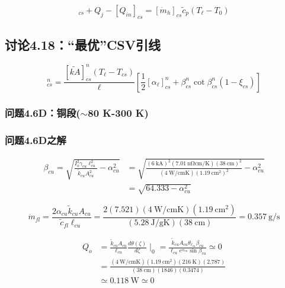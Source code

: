 \begin{equation}%
[Q_\ell]_{cs}+Q_j-[Q_{in}]_{cs}=[\dot{m}_h]_{cs}\tilde{c}_p(T_\ell-T_0)
\end{equation}


\subsection{讨论4.18：“最优”CSV引线}

\begin{equation}%
[Q_\ell]_{cs}^{n}=\frac{[\tilde{kA}]_{cs}^{n}(T_\ell-T_{cs})}{\ell}\left[\frac{1}{2}[\alpha_\ell]_{cs}^{n}+\beta_{cs}^{n}\cot\beta_{cs}^{n}(1-\xi_{cs})\right]
\end{equation}


\subsubsection{问题4.6D：铜段($\sim$80 K-300 K)}



\subsubsection{问题4.6D之解}
\begin{align*}
\beta_{cu}=\sqrt{\frac{I_{o}^{2}\gamma_{cu}\ell_{cu}^{2}}{\tilde{k}_{cu}A_{cu}^{2}}-\alpha_{cu}^{2}}&=\sqrt{\frac{(6\ \mathrm{kA})^2(7.01\ \mathrm{n\Omega cm/K})(38\ \mathrm{cm})^2}{(4\ \mathrm{W /cmK})(1.19\ \mathrm{cm^2})^2}-\alpha_{cu}^{2}} \\
&=\sqrt{64.333-\alpha_{cu}^{2}}
\end{align*}

\begin{equation}
\dot{m}_{fl}=\frac{2\alpha_{cu}\tilde{k}_{cu}A_{cu}}{\tilde{c}_{fl}\ell_{cu}} 
=\frac{2(7.521)(4\ \mathrm{W/cmK})(1.19\ \mathrm{cm^2})}{(5.28\ \mathrm{J/gK})(38\ \mathrm{cm})}=0.357\ \mathrm{g/s}
\end{equation}

\begin{align}%
Q_o&=\frac{\tilde{k}_{cu}A_{cu}}{\ell_{cu}}\frac{d\theta(\zeta)}{d\zeta}\mid_0=\frac{\tilde{k}_{cu}A_{cu}\theta_{\ell_{cu}}\beta_{cu}}{\ell_{cu}e^{\alpha_{cu}}\sin\beta_{cu}}\simeq 0 \\
&=\frac{(4\ \mathrm{W/cmK})(1.19\ \mathrm{cm^2})(216\ \mathrm{K})(2.787)}{(38\ \mathrm{cm})(1846)(0.3474)}\\
&\simeq 0.118\ \mathrm{W}\simeq 0
\end{align}




